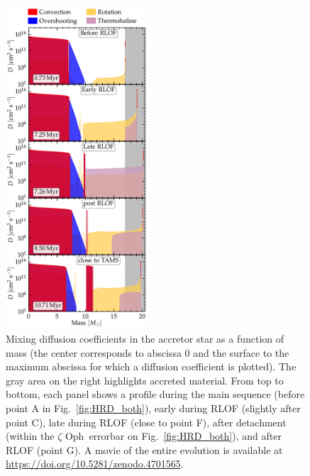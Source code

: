 \documentclass[twocolumn,twocolappendix,trackchanges]{aastex63}
\DeclareRobustCommand{\Figref}[1]{Fig.~\ref{#1}}
\newcommand{\zoph}{$\zeta$ Oph}
\begin{document}
\begin{figure}[htbp]
  \includegraphics[width=0.47\textwidth]{D_mix_vertical}
  \caption{Mixing diffusion coefficients in the accretor star as a
    function of mass (the center corresponds to abscissa 0 and the
    surface to the maximum abscissa for which a diffusion coefficient
    is plotted). The gray area on the right highlights accreted
    material. From top to bottom, each panel shows a profile during
    the main sequence (before point A in \Figref{fig:HRD_both}), early
    during RLOF (slightly after point C), late during RLOF (close to
    point F), after detachment (within the \zoph\ errorbar on
    \Figref{fig:HRD_both}), and after RLOF (point G). A movie of the
    entire evolution is available at
    \url{https://doi.org/10.5281/zenodo.4701565}.}
  \label{fig:D_mix}
\end{figure}
\end{document}
